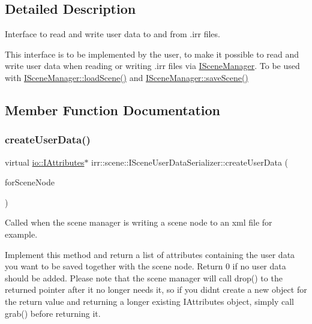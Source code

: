 \subsection{Detailed Description}
Interface to read and write user data to and from .irr files. 

This interface is to be implemented by the user, to make it possible to read and write user data when reading or writing .irr files via \hyperlink{classirr_1_1scene_1_1ISceneManager}{I\+Scene\+Manager}. To be used with \hyperlink{classirr_1_1scene_1_1ISceneManager_aa7641dd33e84fca7946ed17047349a3e}{I\+Scene\+Manager\+::load\+Scene()} and \hyperlink{classirr_1_1scene_1_1ISceneManager_a6dd059e96ff4f7233b7ba1ed7e39c337}{I\+Scene\+Manager\+::save\+Scene()} 

\subsection{Member Function Documentation}
\mbox{\label{classirr_1_1scene_1_1ISceneUserDataSerializer_a8d276882257602ffc03a23a38290ea44}} 
\subsubsection{\texorpdfstring{create\+User\+Data()}{createUserData()}}
{\footnotesize\ttfamily virtual \hyperlink{classirr_1_1io_1_1IAttributes}{io\+::\+I\+Attributes}$\ast$ irr\+::scene\+::\+I\+Scene\+User\+Data\+Serializer\+::create\+User\+Data (\begin{DoxyParamCaption}\item[{\hyperlink{classirr_1_1scene_1_1ISceneNode}{I\+Scene\+Node} $\ast$}]{for\+Scene\+Node }\end{DoxyParamCaption})\hspace{0.3cm}{\ttfamily [pure virtual]}}



Called when the scene manager is writing a scene node to an xml file for example. 

Implement this method and return a list of attributes containing the user data you want to be saved together with the scene node. Return 0 if no user data should be added. Please note that the scene manager will call drop() to the returned pointer after it no longer needs it, so if you didn\textquotesingle{}t create a new object for the return value and returning a longer existing I\+Attributes object, simply call grab() before returning it. \mbox{\label{classirr_1_1scene_1_1ISceneUserDataSerializer_a48276bde0e05343d39ec25c6933f122d}} 
